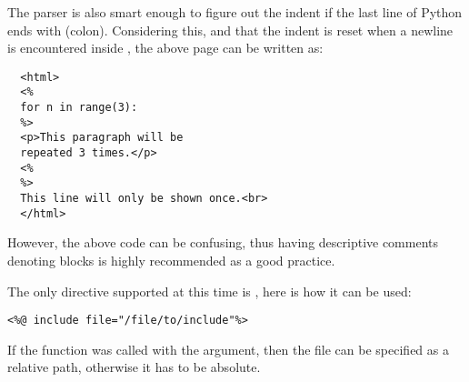 The parser is also smart enough to figure out the indent if the last
line of Python ends with \samp{:} (colon). Considering this, and that the
indent is reset when a newline is encountered inside \samp{<\% \%>}, the
above page can be written as:

\begin{verbatim}
  <html>
  <%
  for n in range(3):
  %>
  <p>This paragraph will be 
  repeated 3 times.</p>
  <%
  %>
  This line will only be shown once.<br>
  </html>
\end{verbatim}

However, the above code can be confusing, thus having descriptive
comments denoting blocks is highly recommended as a good practice.

The only directive supported at this time is , here is
how it can be used:

\begin{verbatim}
<%@ include file="/file/to/include"%>
\end{verbatim}

If the  function was called with the 
argument, then the file can be specified as a relative path, otherwise
it has to be absolute.


